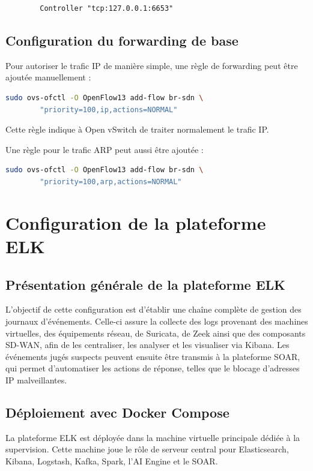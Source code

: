 \documentclass[12pt,a4paper,oneside]{report}
\begin{document}
	\begin{lstlisting}
		Controller "tcp:127.0.0.1:6653"
	\end{lstlisting}

	
	\subsection{Configuration du forwarding de base}
	
	Pour autoriser le trafic IP de manière simple, une règle de forwarding peut être ajoutée manuellement :
	
	\begin{lstlisting}[language=bash]
		sudo ovs-ofctl -O OpenFlow13 add-flow br-sdn \
		"priority=100,ip,actions=NORMAL"
	\end{lstlisting}
	
	Cette règle indique à Open vSwitch de traiter normalement le trafic IP.
	
	Une règle pour le trafic ARP peut aussi être ajoutée :
	
	\begin{lstlisting}[language=bash]
		sudo ovs-ofctl -O OpenFlow13 add-flow br-sdn \
		"priority=100,arp,actions=NORMAL"
	\end{lstlisting}
    	\section{Configuration de la plateforme ELK}
    
    \subsection{Présentation générale de la plateforme ELK}
    
    L'objectif de cette configuration est d'établir une chaîne complète de gestion des journaux d'événements. Celle-ci assure la collecte des logs provenant des machines virtuelles, des équipements réseau, de Suricata, de Zeek ainsi que des composants SD-WAN, afin de les centraliser, les analyser et les visualiser via Kibana. Les événements jugés suspects peuvent ensuite être transmis à la plateforme SOAR, qui permet d'automatiser les actions de réponse, telles que le blocage d'adresses IP malveillantes.
    \subsection{Déploiement avec Docker Compose}
    
    La plateforme ELK est déployée dans la machine virtuelle principale dédiée à la supervision. Cette machine joue le rôle de serveur central pour Elasticsearch, Kibana, Logstash, Kafka, Spark, l'AI Engine et le SOAR.
    
\end{document}
